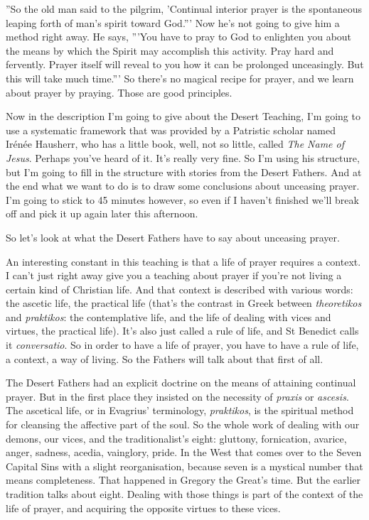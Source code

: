 ''So the old man said to the pilgrim, 'Continual interior prayer is the spontaneous leaping forth of man's spirit toward God.''' Now he's not going to give him a method right away. He says, '''You have to pray to God to enlighten you about the means by which the Spirit may accomplish this activity. Pray hard and fervently. Prayer itself will reveal to you how it can be prolonged unceasingly. But this will take much time.''' So there's no magical recipe for prayer, and we learn about prayer by praying. Those are good principles.

Now in the description I'm going to give about the Desert Teaching, I'm going to use a systematic framework that was provided by a Patristic scholar named Ir\'{e}n\'{e}e Hausherr, who has a little book, well, not so little, called \emph{The Name of Jesus}. Perhaps you've heard of it. It's really very fine. So I'm using his structure, but I'm going to fill in the structure with stories from the Desert Fathers. And at the end what we want to do is to draw some conclusions about unceasing prayer. I'm going to stick to 45 minutes however, so even if I haven't finished we'll break off and pick it up again later this afternoon.

So let's look at what the Desert Fathers have to say about unceasing prayer.

An interesting constant in this teaching is that a life of prayer requires a context. I can't just right away give you a teaching about prayer if you're not living a certain kind of Christian life. And that context is described with various words: the ascetic life, the practical life (that's the contrast in Greek between \emph{theoretikos} and \emph{praktikos}: the contemplative life, and the life of dealing with vices and virtues, the practical life). It's also just called a rule of life, and St Benedict calls it \emph{conversatio}. So in order to have a life of prayer, you have to have a rule of life, a context, a way of living. So the Fathers will talk about that first of all.

The Desert Fathers had an explicit doctrine on the means of attaining continual prayer. But in the first place they insisted on the necessity of \emph{praxis} or \emph{ascesis}. The ascetical life, or in Evagrius' terminology, \emph{praktikos}, is the spiritual method for cleansing the affective part of the soul. So the whole work of dealing with our demons, our vices, and the traditionalist's eight: gluttony, fornication, avarice, anger, sadness, acedia, vainglory, pride. In the West that comes over to the Seven Capital Sins with a slight reorganisation, because seven is a mystical number that means completeness. That happened in Gregory the Great's time. But the earlier tradition talks about eight. Dealing with those things is part of the context of the life of prayer, and acquiring the opposite virtues to these vices.

